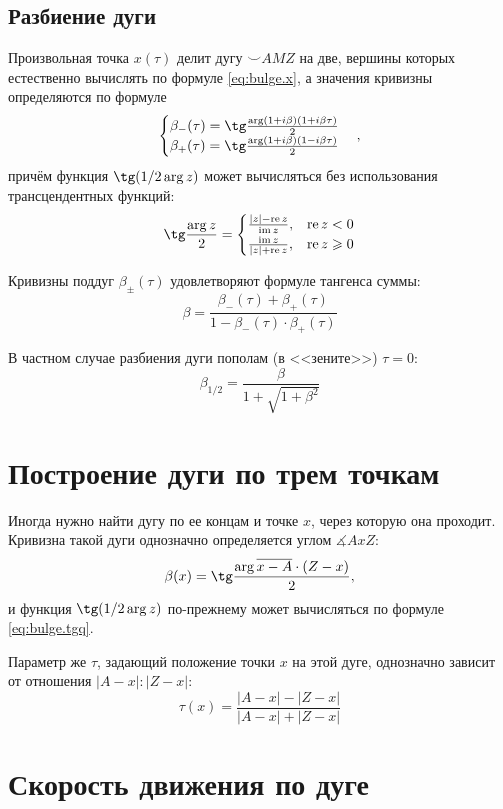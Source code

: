 \subsection*{Разбиение дуги}

Произвольная точка
$x(\tau)$
делит дугу
${\smile}AMZ$
на две,
вершины которых естественно вычислять по формуле
\eqref{eq:bulge.x},
а значения кривизны определяются по формуле
$$
\begin{cases}
  \beta_{-}(\tau)= \tg \frac{\arg (1+i\beta)(1+i\beta\tau)}2
  \\
  \beta_{+}(\tau)= \tg \frac{\arg (1+i\beta)(1-i\beta\tau)}2
  \end{cases}
  ,
$$
причём функция
$\tg(1/2\arg z)$
может вычисляться без использования
трансцендентных функций:
\begin{equation}
  \label{eq:bulge.tgq}
  \tg \frac{\arg z}2 =
  \begin{cases}
    \frac{|z|-\operatorname{re} z}{\operatorname{im} z}, & \operatorname{re} z < 0
    \\
    \frac{\operatorname{im} z}{|z|+\operatorname{re} z}, & \operatorname{re} z \geqslant 0
  \end{cases}
\end{equation}

Кривизны поддуг
$\beta_{\pm}(\tau)$
удовлетворяют формуле тангенса суммы:
$$
\beta = \frac{\beta_{-}(\tau)+\beta_{+}(\tau)}{1-\beta_{-}(\tau)\cdot\beta_{+}(\tau)}
$$

В частном случае разбиения дуги пополам
(в <<зените>>)
$\tau=0$:
$$
\beta_{1/2}=
  \frac{\beta}{1+\sqrt{1+\beta^2}}
$$

\section*{Построение дуги по трем точкам}

Иногда нужно найти дугу по ее концам и точке $x$,
через которую она проходит.
Кривизна такой дуги однозначно определяется
углом $\measuredangle AxZ$:
$$
\beta(x) =
  \tg \frac{\arg \overline{x - A} \cdot \left(Z- x \right)}{2}
  ,
$$
и функция
$\tg(1/2\arg z)$
по-прежнему может вычисляться по формуле~
\eqref{eq:bulge.tgq}.

Параметр же
$\tau$,
задающий положение точки $x$
на этой дуге,
однозначно зависит от отношения
$|A-x|:|Z-x|$:
$$
\tau(x) =
  \frac{|A-x|-|Z-x|}{|A-x|+|Z-x|}
$$

\section*{Скорость движения по дуге}

